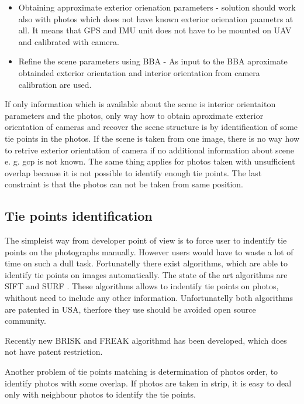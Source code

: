 \documentclass[a4paper,12pt]{report}
\begin{document}
\begin{itemize}
\begin{itemize}
\item Obtaining approximate exterior orienation parameters - solution should work also with photos 
which does not have known exterior orienation paametrs at all. It means 
that GPS and IMU unit does not have to be mounted on UAV and calibrated with camera.
  

\item Refine the scene parameters using BBA - As input to the BBA aproximate obtainded exterior orientation
and interior orientation from camera calibration are used.

\end{itemize}

If only information which is available about the scene is interior orientaiton parameters and the photos, 
only way how to obtain aproximate exterior orientation of cameras and recover the scene structure is 
by identification of some tie points in the photos. If the scene is taken from one image, there is no way how
to retrive exterior orientation of camera if no additional information about scene e. g. gcp is not known. 
The same thing applies for photos taken with  unsufficient overlap because it is not possible to 
identify enough tie points. The last constraint is that the photos can not be taken from same position.

\subsection{Tie points identification}

The simpleist way from developer point of view is to force user to indentify tie points on 
the photographs manually. However users would have to waste a lot of time on such a 
dull task. Fortunatelly there  exist algorithms, which are able to identify tie points on images
automatically. The state of the art algorithms are SIFT \cite{wiki:SIFT} and SURF \cite{wiki:SURF}.
These algorithms allows to indentify tie points on photos, whithout need to include any other information.
Unfortunatelly both algorithms are patented in USA, therfore they use should be avoided open source community.

Recently new BRISK \cite{leutenegger2011brisk} and FREAK \cite{alahi2012freak} algorithmd 
has been developed, which does not have patent restriction. 

Another problem of tie points matching is determination of photos order, to identify photos with some overlap. 
If photos are taken in strip, it is easy to deal only with neighbour photos to identify the tie points.


\end{itemize}
\end{document}
